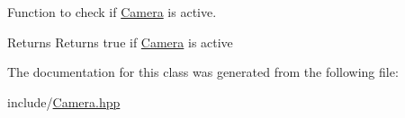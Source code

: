 Function to check if \hyperlink{classCamera}{Camera} is active. 

\begin{DoxyReturn}{Returns}
Returns true if \hyperlink{classCamera}{Camera} is active 
\end{DoxyReturn}


The documentation for this class was generated from the following file\+:\begin{DoxyCompactItemize}
\item 
include/\hyperlink{Camera_8hpp}{Camera.\+hpp}\end{DoxyCompactItemize}
